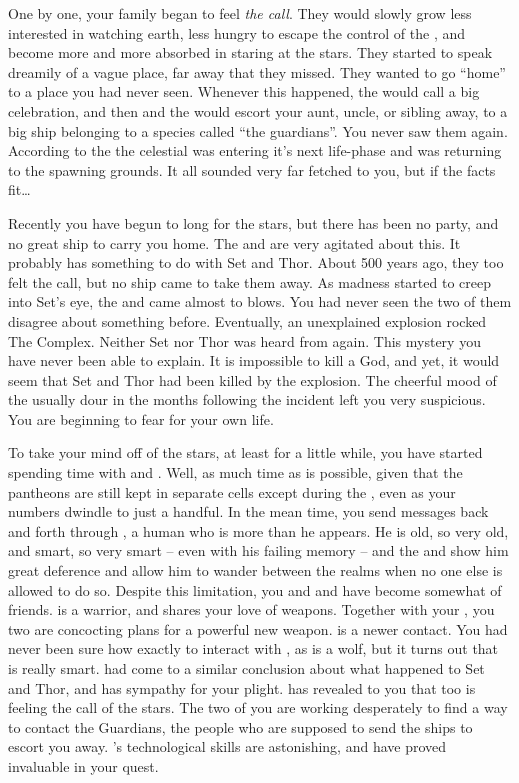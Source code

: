 \documentclass[char]{guardians}
\begin{document}
One by one, your family began to feel \emph{the call}. They would slowly grow less interested in watching earth, less hungry to escape the control of the \cWarden{}, and become more and more absorbed in staring at the stars. They started to speak dreamily of a vague place, far away that they missed. They wanted to go ``home'' to a place you had never seen. Whenever this happened, the \cCaretaker{} would call a big celebration, and then \cCaretaker{\they} and the \cWarden{} would escort your aunt, uncle, or sibling away, to a big ship belonging to a species called ``the guardians''. You never saw them again.  According to the \cCaretaker{} the celestial was entering it's next life-phase and was returning to the spawning grounds. It all sounded very far fetched to you, but if the facts fit\ldots{}

Recently you have begun to long for the stars, but there has been no party, and no great ship to carry you home. The \cCaretaker{} and \cWarden{} are very agitated about this. It probably has something to do with Set and Thor. About 500 years ago, they too felt the call, but no ship came to take them away. As madness started to creep into Set's eye, the \cCaretaker{} and \cWarden{} came almost to blows. You had never seen the two of them disagree about something before.  Eventually, an unexplained explosion rocked The Complex. Neither Set nor Thor was heard from again. This mystery you have never been able to explain. It is impossible to kill a God, and yet, it would seem that Set and Thor had been killed by the explosion. The cheerful mood of the usually dour \cWarden{} in the months following the incident left you very suspicious. You are beginning to fear for your own life.

To take your mind off of the stars, at least for a little while, you have started spending time with \cFenrir{} and \cVal{}. Well, as much time as is possible, given that the pantheons are still kept in separate cells except during the \pGames{}, even as your numbers dwindle to just a handful. In the mean time, you send messages back and forth through \cJascha{}, a human who is more than he appears. He is old, so very old, and smart, so very smart -- even with his failing memory -- and the \cWarden{} and \cCaretaker{} show him great deference and allow him to wander between the realms when no one else is allowed to do so.  Despite this limitation, you and \cFenrir{} and \cVal{} have become somewhat of friends. \cVal{} is a warrior, and shares your love of weapons. Together with your \cHephaestus{\sibling}, \cHephaestus{} you two are concocting plans for a powerful new weapon. \cFenrir{} is a newer contact. You had never been sure how exactly to interact with \cFenrir{\them}, as \cFenrir{\they} is a wolf, but it turns out that \cFenrir{\they} is really smart. \cFenrir{} had come to a similar conclusion about what happened to Set and Thor, and has sympathy for your plight. \cFenrir{} has revealed to you that \cFenrir{\they} too is feeling the call of the stars. The two of you are working desperately to find a way to contact the Guardians, the people who are supposed to send the ships to escort you away. \cFenrir{}'s technological skills are astonishing, and have proved invaluable in your quest.
\end{document}
